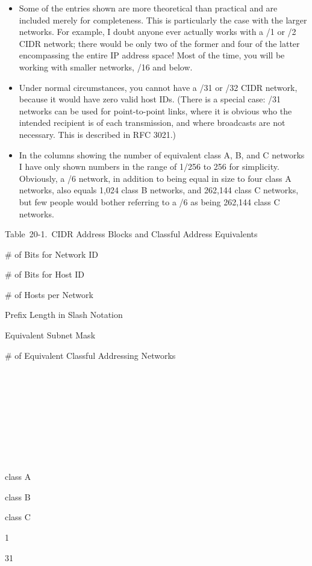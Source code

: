 \documentclass[b5paper,11pt]{memoir}
\begin{document}
\begin{itemize}
\item
  Some of the entries shown are more theoretical than practical and are
  included merely for completeness. This is particularly the case with
  the larger networks. For example, I doubt anyone ever actually works
  with a /1 or /2 CIDR network; there would be only two of the former
  and four of the latter encompassing the entire IP address space! Most
  of the time, you will be working with smaller networks, /16 and below.
\item
  Under normal circumstances, you cannot have a /31 or /32 CIDR network,
  because it would have zero valid host IDs. (There is a special case:
  /31 networks can be used for point-to-point links, where it is obvious
  who the intended recipient is of each transmission, and where
  broadcasts are not necessary. This is described in RFC 3021.)
\item
  In the columns showing the number of equivalent class A, B, and C
  networks I have only shown numbers in the range of 1/256 to 256 for
  simplicity. Obviously, a /6 network, in addition to being equal in
  size to four class A networks, also equals 1,024 class B networks, and
  262,144 class C networks, but few people would bother referring to a
  /6 as being 262,144 class C networks.
\end{itemize}

\protect\hypertarget{ch20s03.htmlux5cux23cidr_address_blocks_and_classful_address}{}{}

Table~20-1.~CIDR Address Blocks and Classful Address Equivalents

\# of Bits for Network ID

\# of Bits for Host ID

\# of Hosts per Network

Prefix Length in Slash Notation

Equivalent Subnet Mask

\# of Equivalent Classful
\protect\hypertarget{ch20s03.htmlux5cux23idx-CHP-20-0771}{}{}Addressing
Networks

~

~

~

~

~

class A

class B

class C

1

31
\end{document}
